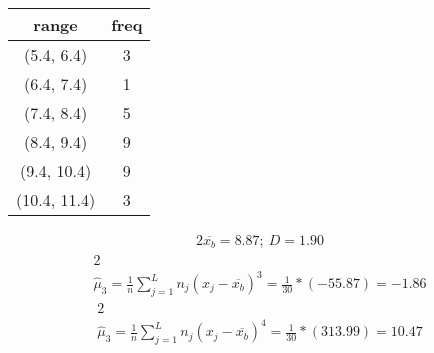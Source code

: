 \documentclass{article}%
\begin{document}
%
\normalsize%
\begin{tabular}{c|c}
\toprule
       range &  freq \\
\midrule
  (5.4, 6.4) &     3 \\
  (6.4, 7.4) &     1 \\
  (7.4, 8.4) &     5 \\
  (8.4, 9.4) &     9 \\
 (9.4, 10.4) &     9 \\
(10.4, 11.4) &     3 \\
\bottomrule
\end{tabular}
%
\begin{alignat*}{2}%
\overline {{ x_{{b}} }} = 8.87%
;~ D = 1.90%
\end{alignat*}%
\begin{alignat*}{2}%
\\ \hat{\mu}_3
            = \frac 1 n \sum\limits_{j = 1}^L {n_j (x_j - \overline {{ x_{{b}} }})^3}
            = \frac 1 { 30 } * (-55.87)
            = -1.86
\end{alignat*}%
\begin{alignat*}{2}%
\\ \hat{\mu}_3
            = \frac 1 n \sum\limits_{j = 1}^L {n_j (x_j - \overline {{ x_{{b}} }})^4}
            = \frac 1 { 30 } * (313.99)
            = 10.47
\end{alignat*}%
\end{document}
